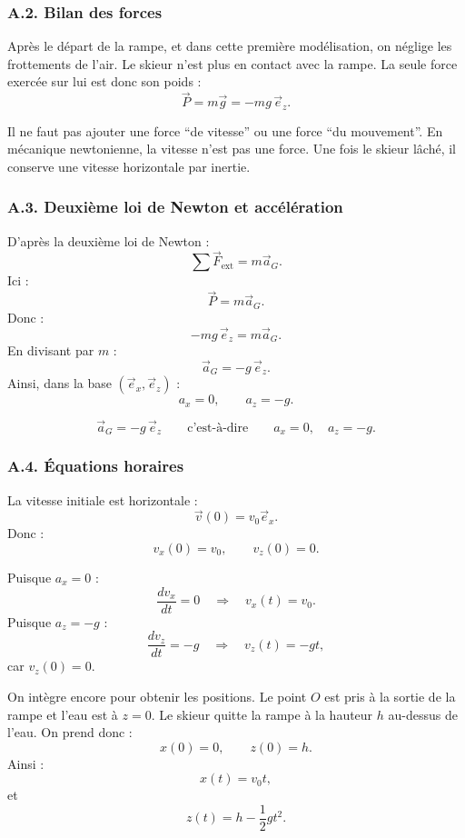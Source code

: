 \documentclass[11pt,a4paper]{article}
\begin{document}
\subsubsection*{A.2. Bilan des forces}

Après le départ de la rampe, et dans cette première modélisation, on néglige les frottements de l'air.
Le skieur n'est plus en contact avec la rampe. La seule force exercée sur lui est donc son poids :
\[
\vec P = m\vec g = -mg\,\vec e_z.
\]

\begin{attentionbox}
Il ne faut pas ajouter une force ``de vitesse'' ou une force ``du mouvement''. En mécanique newtonienne,
la vitesse n'est pas une force. Une fois le skieur lâché, il conserve une vitesse horizontale par inertie.
\end{attentionbox}

\subsubsection*{A.3. Deuxième loi de Newton et accélération}

D'après la deuxième loi de Newton :
\[
\sum \vec F_{\text{ext}} = m\vec a_G.
\]
Ici :
\[
\vec P = m\vec a_G.
\]
Donc :
\[
-mg\,\vec e_z = m\vec a_G.
\]
En divisant par $m$ :
\[
\vec a_G = -g\,\vec e_z.
\]
Ainsi, dans la base $(\vec e_x,\vec e_z)$ :
\[
a_x=0,\qquad a_z=-g.
\]

\begin{resultatbox}
\[
\boxed{\vec a_G = -g\,\vec e_z}
\qquad\text{c'est-à-dire}\qquad
\boxed{a_x=0,\quad a_z=-g.}
\]
\end{resultatbox}

\subsubsection*{A.4. Équations horaires}

La vitesse initiale est horizontale :
\[
\vec v(0)=v_0\vec e_x.
\]
Donc :
\[
v_x(0)=v_0,\qquad v_z(0)=0.
\]

Puisque $a_x=0$ :
\[
\frac{dv_x}{dt}=0 \quad\Rightarrow\quad v_x(t)=v_0.
\]
Puisque $a_z=-g$ :
\[
\frac{dv_z}{dt}=-g \quad\Rightarrow\quad v_z(t)=-gt,
\]
car $v_z(0)=0$.

On intègre encore pour obtenir les positions. Le point $O$ est pris à la sortie de la rampe et l'eau est à $z=0$.
Le skieur quitte la rampe à la hauteur $h$ au-dessus de l'eau. On prend donc :
\[
x(0)=0,\qquad z(0)=h.
\]
Ainsi :
\[
x(t)=v_0t,
\]
et
\[
z(t)=h-\frac12gt^2.
\]
\end{document}
